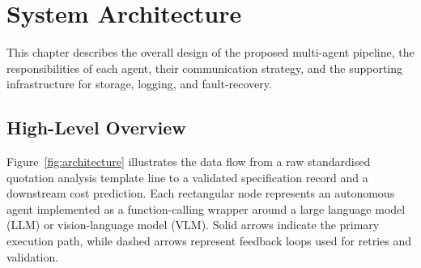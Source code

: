 \chapter{System Architecture}
\label{chapter:architecture}

This chapter describes the overall design of the proposed multi-agent pipeline, the responsibilities of each agent, their communication strategy, and the supporting infrastructure for storage, logging, and fault-recovery.

\section{High-Level Overview}

Figure~\ref{fig:architecture} illustrates the data flow from a raw standardised quotation analysis template line to a validated specification record and a downstream cost prediction.  
Each rectangular node represents an autonomous agent implemented as a function-calling wrapper around a large language model (LLM) or vision-language model (VLM).  
Solid arrows indicate the primary execution path, while dashed arrows represent feedback loops used for retries and validation.


